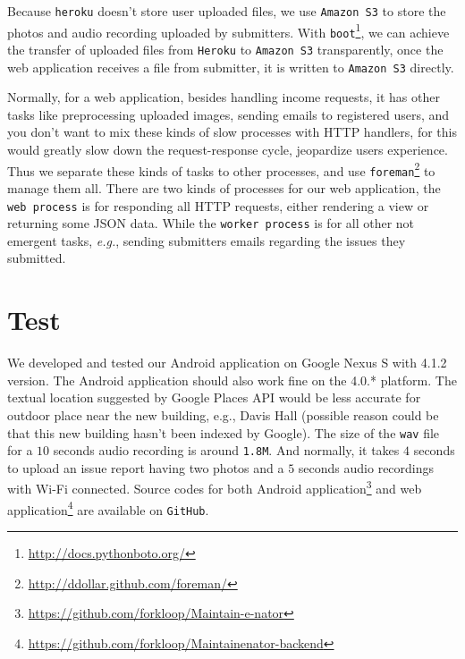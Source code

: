 \documentclass{acm_proc_article-sp}
\begin{document}
Because \texttt{heroku} doesn't store user uploaded files, we use \texttt{Amazon S3} to store the photos and audio recording uploaded by submitters.
With \texttt{boot}\footnote{\url{http://docs.pythonboto.org/}}, we can achieve the transfer of uploaded files from \texttt{Heroku} to \texttt{Amazon S3}
transparently, once the web application receives a file from submitter, it is written to \texttt{Amazon S3} directly.

Normally, for a web application, besides handling income requests, it has other tasks like preprocessing uploaded images, sending emails to registered users,
and you don't want to mix these kinds of slow processes with HTTP handlers, for this would greatly slow down the request-response cycle, jeopardize users
experience. Thus we separate these kinds of tasks to other processes,
and use \texttt{foreman}\footnote{\url{http://ddollar.github.com/foreman/}} to manage them all.
There are two kinds of processes for our web application, the \texttt{web process} is for responding all HTTP requests, either rendering a view or
returning some JSON data. While the \texttt{worker process} is for all other not emergent tasks, \textit{e.g.}, sending submitters emails regarding the issues they
submitted.

\section{Test}
We developed and tested our Android application on Google Nexus S with 4.1.2 version. The Android application should also work fine on the
4.0.* platform. The textual location suggested by Google Places API would be less accurate for outdoor place near the new building, e.g., Davis Hall
(possible reason could be that this new building hasn't been indexed by Google).
The size of the \texttt{wav} file for a $10$ seconds audio recording is around \texttt{1.8M}.
And normally, it takes $4$ seconds to upload an issue report having two photos and a $5$ seconds audio recordings with Wi-Fi connected.
Source codes for both Android application\footnote{\url{https://github.com/forkloop/Maintain-e-nator}} and
web application\footnote{\url{https://github.com/forkloop/Maintainenator-backend}} are available on \texttt{GitHub}.

\end{document}
